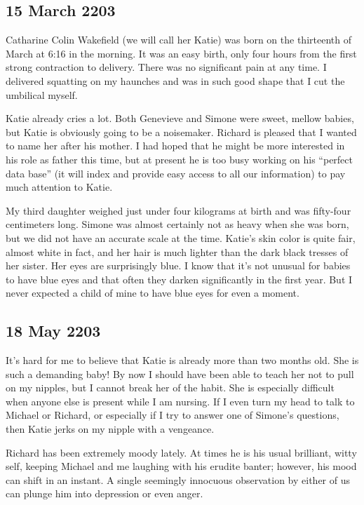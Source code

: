 \documentclass[]{article}
\begin{document}
\subsection*{15 March 2203}

Catharine Colin Wakefield (we will call her Katie) was born on the thirteenth of March at 6:16 in the morning.  It was an easy birth, only four hours from the first strong contraction to delivery.  There was no significant pain at any time.  I delivered squatting on my haunches and was in such good shape that I cut the umbilical myself.

Katie already cries a lot.  Both Genevieve and Simone were sweet, mellow babies, but Katie is obviously going to be a noisemaker.  Richard is pleased that I wanted to name her after his mother.  I had hoped that he might be more interested in his role as father this time, but at present he is too busy working on his “perfect data base” (it will index and provide easy access to all our information) to pay much attention to Katie.

My third daughter weighed just under four kilograms at birth and was fifty-four centimeters long.  Simone was almost certainly not as heavy when she was born, but we did not have an accurate scale at the time.  Katie’s skin color is quite fair, almost white in fact, and her hair is much lighter than the dark black tresses of her sister.  Her eyes are surprisingly blue.  I know that it’s not unusual for babies to have blue eyes and that often they darken significantly in the first year.  But I never expected a child of mine to have blue eyes for even a moment.

\subsection*{18 May 2203}

It’s hard for me to believe that Katie is already more than two months old.  She is such a demanding baby! By now I should have been able to teach her not to pull on my nipples, but I cannot break her of the habit.  She is especially difficult when anyone else is present while I am nursing.  If I even turn my head to talk to Michael or Richard, or especially if I try to answer one of Simone’s questions, then Katie jerks on my nipple with a vengeance.

Richard has been extremely moody lately.  At times he is his usual brilliant, witty self, keeping Michael and me laughing with his erudite banter; however, his mood can shift in an instant.  A single seemingly innocuous observation by either of us can plunge him into depression or even anger.
\end{document}
